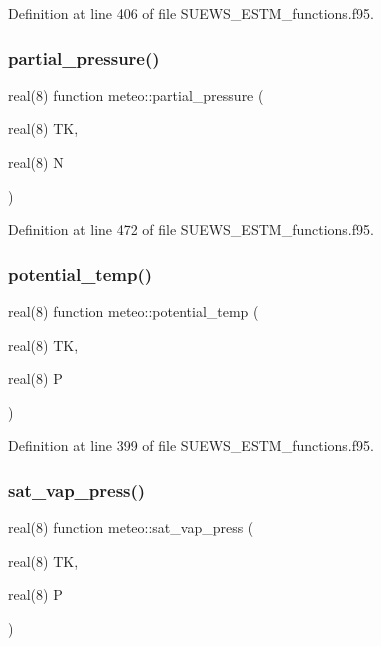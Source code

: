 Definition at line 406 of file S\+U\+E\+W\+S\+\_\+\+E\+S\+T\+M\+\_\+functions.\+f95.

\mbox{\label{namespacemeteo_a0171c7d6a68810bdaa89cb39c92ee96f}} 
\subsubsection{\texorpdfstring{partial\+\_\+pressure()}{partial\_pressure()}}
{\footnotesize\ttfamily real(8) function meteo\+::partial\+\_\+pressure (\begin{DoxyParamCaption}\item[{real(8)}]{TK,  }\item[{real(8)}]{N }\end{DoxyParamCaption})}



Definition at line 472 of file S\+U\+E\+W\+S\+\_\+\+E\+S\+T\+M\+\_\+functions.\+f95.

\mbox{\label{namespacemeteo_a537068a2255cff524747621cd522b93a}} 
\subsubsection{\texorpdfstring{potential\+\_\+temp()}{potential\_temp()}}
{\footnotesize\ttfamily real(8) function meteo\+::potential\+\_\+temp (\begin{DoxyParamCaption}\item[{real(8)}]{TK,  }\item[{real(8)}]{P }\end{DoxyParamCaption})}



Definition at line 399 of file S\+U\+E\+W\+S\+\_\+\+E\+S\+T\+M\+\_\+functions.\+f95.

\mbox{\label{namespacemeteo_a6777852efdfd10f05bb7467fd99f03ec}} 
\subsubsection{\texorpdfstring{sat\+\_\+vap\+\_\+press()}{sat\_vap\_press()}}
{\footnotesize\ttfamily real(8) function meteo\+::sat\+\_\+vap\+\_\+press (\begin{DoxyParamCaption}\item[{real(8)}]{TK,  }\item[{real(8)}]{P }\end{DoxyParamCaption})}



